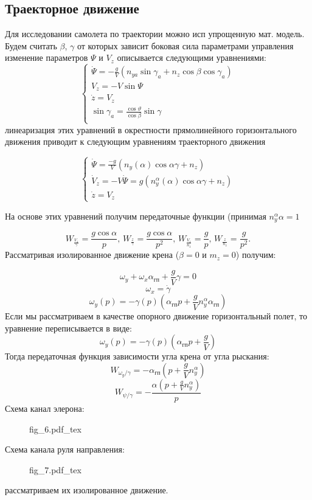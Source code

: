 \documentclass{article}
\begin{document}
\subsection{Траекторное движение}
Для исследовании самолета по траектории можно исп упрощенную мат. модель. Будем
считать $\beta$, $\gamma$ от которых зависит боковая сила параметрами
управления изменение параметров $\Psi$ и $V_z$ описывается следующими
уравнениями:
\begin{equation}
    \begin{cases}
        \dot{\Psi} = -\frac{g}{V}(n_{ya} \sin{\gamma_a} + n_z \cos{\beta}
        \cos{\gamma_a}) \\
        V_z = -V\sin{\Psi}
        \\
        \dot{z} = V_z
        \\

        \sin{\gamma_a} = \frac{\cos{\vartheta}}{\cos{\beta}} \sin{\gamma}
        \\
    \end{cases}
\end{equation}
линеаризация этих уравнений в окрестности прямолинейного горизонтального
движения приводит к следующим уравнениям траекторного движения

\begin{equation}
    \begin{cases}
        \dot{\Psi} = \frac{-g}{V}(n_y(\alpha)\cos{\alpha}\gamma + n_z)
        \\
        \dot{V}_z = -V \dot{\Psi} = g(n_y^{\alpha}(\alpha) \cos{\alpha\gamma} +
        n_z) \\
        \dot{z} = V_z
    \end{cases}
\end{equation}

На основе этих уравнений получим передаточные функции (принимая $n_y^{\alpha}
\alpha =1 $

\[
    W_{\frac{V_z}{\gamma}} = \frac{g\cos{\alpha}}{p}, \, W_{\frac{z}{\gamma}} =
    \frac{g\cos{\alpha}}{p^2}, \, W_{\frac{V_z}{n_z}}= \frac{g}{p}, \,
    W_{\frac{z}{n_z}} = \frac{g}{p^2}.
\]
Рассматривая изолированное движение крена ($\beta = 0$ и $m_z = 0$) получим:

\[
    \omega_y + \omega_x \alpha_{\text{гп}} + \frac{g}{V}\gamma = 0
\]
\[
    \omega_x = \dot{\gamma}
\]
\[
    \omega_y(p) = -\gamma(p)(\alpha_\text{гп}p + \frac{g}{V}n_y^\alpha
    \alpha_\text{гп})
\]
Если мы рассматриваем в качестве опорного движение горизонтальный полет, то
уравнение переписывается в виде:
\[
    \omega_y(p) = -\gamma(p)(\alpha_\text{гп}p + \frac{g}{V})
\]
Тогда передаточная функция зависимости угла крена от угла рыскания:
\[
    W_{\omega_y/\gamma} = -\alpha_\text{гп} (p+\frac{g}{V}n_y^\alpha)
\]
\[
    W_{\psi/\gamma} = -\frac{\alpha(p + \frac{g}{V} n_y^\alpha)} {p}
\]
Схема канал элерона:
\begin{figure}[H]
    \centering
    {fig_6.pdf_tex}
\end{figure}
Схема канала руля направления:
\begin{figure}[H]
    \centering
    {fig_7.pdf_tex}
\end{figure}
рассматриваем их изолированное движение.
\end{document}
